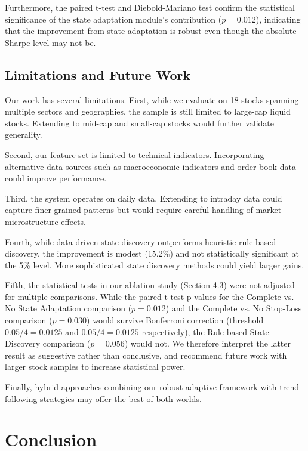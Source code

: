 \documentclass[review]{elsarticle}
\begin{document}
Furthermore, the paired t-test and Diebold-Mariano test \citep{diebold1995comparing} confirm the statistical significance of the state adaptation module's contribution ($p=0.012$), indicating that the improvement from state adaptation is robust even though the absolute Sharpe level may not be.

\subsection{Limitations and Future Work}

Our work has several limitations. First, while we evaluate on 18 stocks spanning multiple sectors and geographies, the sample is still limited to large-cap liquid stocks. Extending to mid-cap and small-cap stocks would further validate generality.

Second, our feature set is limited to technical indicators. Incorporating alternative data sources such as macroeconomic indicators and order book data could improve performance.

Third, the system operates on daily data. Extending to intraday data could capture finer-grained patterns but would require careful handling of market microstructure effects.

Fourth, while data-driven state discovery outperforms heuristic rule-based discovery, the improvement is modest (15.2\%) and not statistically significant at the 5\% level. More sophisticated state discovery methods could yield larger gains.

Fifth, the statistical tests in our ablation study (Section 4.3) were not adjusted for multiple comparisons. While the paired t-test p-values for the Complete vs. No State Adaptation comparison ($p=0.012$) and the Complete vs. No Stop-Loss comparison ($p=0.030$) would survive Bonferroni correction (threshold $0.05/4 = 0.0125$ and $0.05/4 = 0.0125$ respectively), the Rule-based State Discovery comparison ($p=0.056$) would not. We therefore interpret the latter result as suggestive rather than conclusive, and recommend future work with larger stock samples to increase statistical power.

Finally, hybrid approaches combining our robust adaptive framework with trend-following strategies may offer the best of both worlds.

\section{Conclusion}
\end{document}

